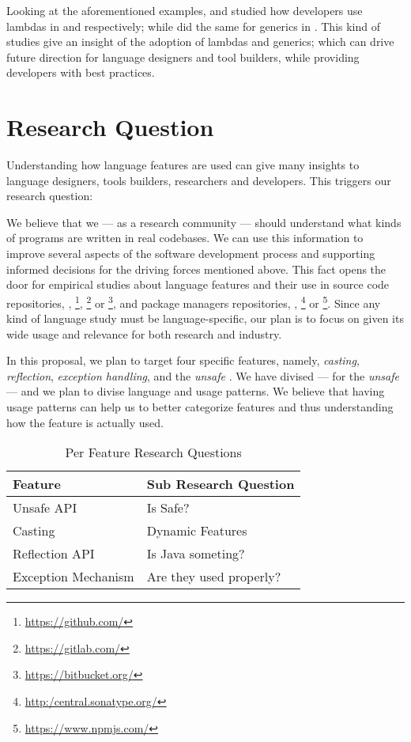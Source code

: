 \documentclass{usiinfdocprop}
\begin{document}
Looking at the aforementioned examples, \cite{mazinanian_understanding_2017} and \cite{uesbeck_empirical_2016} studied how developers use lambdas in \java{} and \cpp{} respectively; while \cite{parnin_java_2011,parnin_adoption_2013} did the same for generics in \java{}.
This kind of studies give an insight of the adoption of lambdas and generics; which can drive future direction for language designers and tool builders, while providing developers with best practices.

\section{Research Question}
\label{sec:orgb16a4cf}
Understanding how language features are used can give many insights to language designers, tools builders, researchers and developers.
This triggers our research question:


We believe that we --- as a research community --- should understand what kinds of programs are written in real codebases.
We can use this information to improve several aspects of the software development process and supporting informed decisions for the driving forces mentioned above.
This fact opens the door for empirical studies about language features and their use in source code repositories, \eg{}, \github \footnote{\url{https://github.com/}}, \gitlab \footnote{\url{https://gitlab.com/}} or \bitbucket \footnote{\url{https://bitbucket.org/}}, and package managers repositories, \eg{}, \mavencentral \footnote{\url{http:/central.sonatype.org/}} or \npm \footnote{\url{https://www.npmjs.com/}}.
Since any kind of language study must be language-specific, our plan is to focus on \java{} given its wide usage and relevance for both research and industry.

In this proposal, we plan to target four specific \java{} features, namely, \emph{casting}, \emph{reflection}, \emph{exception handling}, and the \emph{unsafe \api{}}.
We have divised --- for the \emph{unsafe \api{}} --- and we plan to divise language and \api{} usage patterns.
We believe that having usage patterns can help us to better categorize features and thus understanding how the feature is actually used.

\begin{table}[htbp]
\caption{Per Feature Research Questions}
\centering
\begin{tabular}{ll}
\hline
Feature & Sub Research Question\\
\hline
Unsafe API & Is \java{} Safe?\\
Casting & Dynamic Features\\
Reflection API & Is Java someting?\\
Exception Mechanism & Are they used properly?\\
\hline
\end{tabular}
\end{table}
\end{document}
